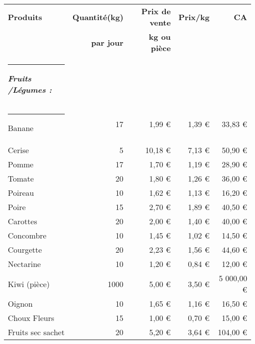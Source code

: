 \documentclass[12pt,a4paper]{report}
\begin{document}
			\begin{table}[h]
				\centering
				\begin{tabular}{lrrrr}
					\textbf{ Produits } & \textbf{Quantité(kg)} & \textbf{ Prix de vente} & \textbf{ Prix/kg } & \textbf{ CA} \\
					& \textbf{par jour} & \textbf{kg ou pièce} & & \\
					\rule[0.5cm]{-0.1cm}{0cm}
					\textit{\textbf{\color{green}Fruits /Légumes : }}&       &       &    &    \\
					\rule[0.5cm]{-0.1cm}{0cm}
					Banane & 17    & 1,99 €  &  1,39 €  &  33,83 €  \\
					 Cerise  & 5     &   10,18 €  &   7,13 €  &  50,90 €  \\
					 Pomme  & 17    &    1,70 €  & 1,19 €  &   28,90 €  \\
					Tomate  & 20    &   1,80 €  & 1,26 €  &   36,00 €  \\
					Poireau  & 10    &  1,62 €  &  1,13 €  & 16,20 €  \\
					Poire  & 15    & 2,70 €  &   1,89 €  &    40,50 €  \\
					 Carottes  & 20    &                                    2,00 €  &                         1,40 €  &                                 40,00 €  \\
					Concombre  & 10    &                                    1,45 €  &                         1,02 €  &                                 14,50 €  \\
					 Courgette  & 20    &                                    2,23 €  &                         1,56 €  &                                 44,60 €  \\
					 Nectarine  & 10    &                                    1,20 €  &                         0,84 €  &                                 12,00 €  \\
					Kiwi (pièce)  & 1000  &                                    5,00 €  &                         3,50 €  &                           5 000,00 €  \\
					Oignon  & 10    &                                    1,65 €  &                         1,16 €  &                                 16,50 €  \\
					Choux Fleurs  & 15    &                                    1,00 €  &                         0,70 €  &                                 15,00 €  \\
					 Fruits sec sachet & 20    &                                    5,20 €  &                         3,64 €  &                               104,00 €  \\

\end{tabular}
\end{table}
\end{document}

